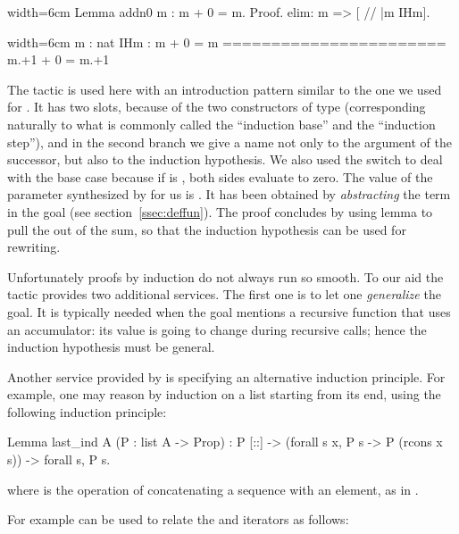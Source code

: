 \begin{coq}{}{width=6cm}
Lemma addn0 m : m + 0 = m.
Proof.
elim: m => [ // |m IHm].
\end{coq}
\begin{coqout}{}{width=6cm}
m : nat
IHm : m + 0 = m
=======================
m.+1 + 0 = m.+1
\end{coqout}
The  tactic is used here with an introduction pattern similar
to the one we used for . It has two slots, because of the
two constructors of type  (corresponding naturally to what is
commonly called the ``induction base'' and the ``induction step''),
and in the second branch we give a
name not only to the argument  of the successor, but also to the
induction hypothesis. We also used the \C{//} switch to deal with the
base case because if
 is , both sides evaluate to zero. The value of the parameter
 synthesized by  for us is
. It has been obtained by
\emph{abstracting} the term  in the goal (see
section~\ref{ssec:deffun}). The proof concludes by using lemma 
to  pull the  out of the sum, so that the induction hypothesis
 can be used for rewriting.

Unfortunately proofs by induction do not always run so smooth.
To our aid the  tactic provides two additional services.
The first one is to let one \emph{generalize}
the goal.  It is typically needed when the goal mentions a recursive function
that uses an accumulator: its value is going to change during recursive calls;
hence the induction hypothesis must be general.

Another service provided by  is specifying an alternative
induction principle. For example, one may reason by induction on
a list starting from its end, using the following induction principle:

\begin{coq}{}{}
Lemma last_ind A (P : list A -> Prop) :
  P [::] -> (forall s x, P s -> P (rcons x s)) -> forall s, P s.
\end{coq}
where  is the operation of concatenating
a sequence with an element, as in .

For example  can be used to relate the
 and  iterators as follows:

